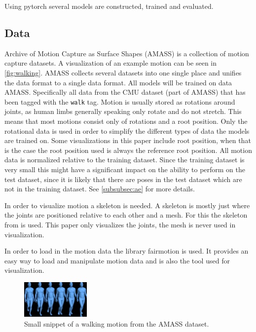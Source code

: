 Using pytorch \cite{pytorch} several models are constructed, trained and evaluated.

\subsection{Data}\label{subsec:data}
Archive of Motion Capture as Surface Shapes (AMASS) \cite{AMASS:2019} is a collection of motion capture datasets. A visualization of an example motion can be seen in \autoref{fig:walking}. AMASS collects several datasets into one single place and unifies the data format to a single data format. All models will be trained on data AMASS. Specifically all data from the CMU \cite{cmuWEB} dataset (part of AMASS) that has been tagged with the \texttt{walk} tag. Motion is usually stored as rotations around joints, as human limbs generally speaking only rotate and do not stretch. This means that most motions consist only of rotations and a root position. Only the rotational data is used in order to simplify the different types of data the models are trained on. Some visualizations in this paper include root position, when that is the case the root position used is always the reference root position. All motion data is normalized relative to the training dataset. Since the training dataset is very small this might have a significant impact on the ability to perform on the test dataset, since it is likely that there are poses in the test dataset which are not in the training dataset. See \ref{subsubsec:ae} for more details.

In order to visualize motion a skeleton is needed. A skeleton is mostly just where the joints are positioned relative to each other and a mesh. For this the skeleton from \cite{MANO} is used. This paper only visualizes the joints, the mesh is never used in visualization.

In order to load in the motion data the library fairmotion \cite{gopinath2020fairmotion} is used. It provides an easy way to load and manipulate motion data and is also the tool used for visualization.


\begin{figure}[h]
\centering
\includegraphics[width=0.3\textwidth]{img/02_01}
\caption{Small snippet of a walking motion from the AMASS dataset.}
\label{fig:walking}
\end{figure}



